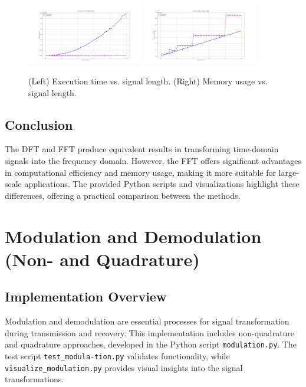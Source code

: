 \documentclass[12pt, a4paper]{report}
\begin{document}
\begin{figure}[h!]
	\centering
	\includegraphics[width=0.45\textwidth]{2023_11_29_Bilder_Dokumentation/Execution_Time_vs_Signal_Length.png}
	\hspace{0.05\textwidth}
	\includegraphics[width=0.45\textwidth]{2023_11_29_Bilder_Dokumentation/Memory_Usage_vs_Signal_length.png}
	\caption{(Left) Execution time vs. signal length. (Right) Memory usage vs. signal length.}
	\label{fig:scaling_comparison}
\end{figure}

\subsection{Conclusion}
The \ac{DFT} and \ac{FFT} produce equivalent results in transforming time-domain signals into the frequency domain. However, the \ac{FFT} offers significant advantages in computational efficiency and memory usage, making it more suitable for large-scale applications. The provided Python scripts and visualizations highlight these differences, offering a practical comparison between the methods.

\section{Modulation and Demodulation (Non- and Quadrature)}

\subsection{Implementation Overview}

Modulation and demodulation are essential processes for signal transformation during transmission and recovery. This implementation includes non-quadrature and quadrature approaches, developed in the Python script \texttt{modulation.py}. The test script \texttt{test\_modula-\newline tion.py} validates functionality, while \texttt{visualize\_modulation.py} provides visual insights into the signal transformations.
\end{document}

